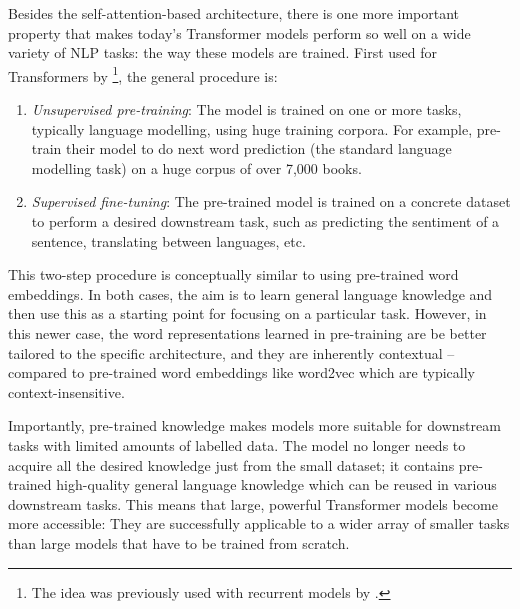 \documentclass[bsc,frontabs,twoside,singlespacing,parskip,deptreport]{infthesis}
\begin{document}
{{{      %
      Besides the self-attention-based architecture, there is one more important property that makes today's Transformer models perform so well on a wide variety of NLP tasks: the way these models are trained. First used for Transformers by \citet{Radford_2018}\footnote{The idea was previously used with recurrent models by \citet{Dai_2015}.}, the general procedure is:
      \begin{enumerate}
        \item \textit{Unsupervised pre-training}: The model is trained on one or more tasks, typically language modelling, using huge training corpora. For example, \citeauthor{Radford_2018} pre-train their model to do next word prediction (the standard language modelling task) on a huge corpus of over 7,000 books.
        \item \textit{Supervised fine-tuning}: The pre-trained model is trained on a concrete dataset to perform a desired downstream task, such as predicting the sentiment of a sentence, translating between languages, etc.
      \end{enumerate}
      This two-step procedure is conceptually similar to using pre-trained word embeddings. In both cases, the aim is to learn general language knowledge and then use this as a starting point for focusing on a particular task. However, in this newer case, the word representations learned in pre-training are be better tailored to the specific architecture, and they are inherently contextual -- compared to pre-trained word embeddings like word2vec which are typically context-insensitive. 

      Importantly, pre-trained knowledge makes models more suitable for downstream tasks with limited amounts of labelled data. The model no longer needs to acquire all the desired knowledge just from the small dataset; it contains pre-trained high-quality general language knowledge which can be reused in various downstream tasks. This means that large, powerful Transformer models become more accessible: They are successfully applicable to a wider array of smaller tasks than large models that have to be trained from scratch.
    }

}}
\end{document}
